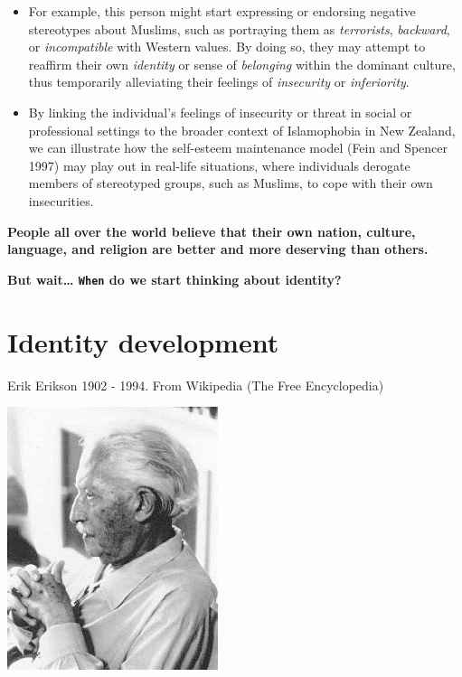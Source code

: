 \documentclass[
  ignorenonframetext,
  aspectratio=169,
]{beamer}
\providecommand{\tightlist}{%
  \setlength{\itemsep}{0pt}\setlength{\parskip}{0pt}}\usepackage{longtable,booktabs,array}
\begin{document}
\begin{frame}
\begin{itemize}[<+->]
\tightlist
\item
  For example, this person might start expressing or endorsing negative
  stereotypes about Muslims, such as portraying them as
  \emph{terrorists}, \emph{backward}, or \emph{incompatible} with
  Western values. By doing so, they may attempt to reaffirm their own
  \emph{identity} or sense of \emph{belonging} within the dominant
  culture, thus temporarily alleviating their feelings of
  \emph{insecurity} or \emph{inferiority}.
\item
  By linking the individual's feelings of insecurity or threat in social
  or professional settings to the broader context of Islamophobia in New
  Zealand, we can illustrate how the self-esteem maintenance model (Fein
  and Spencer 1997) may play out in real-life situations, where
  individuals derogate members of stereotyped groups, such as Muslims,
  to cope with their own insecurities.
\end{itemize}
\end{frame}

\begin{frame}
\textbf{People all over the world believe that their own nation,
culture, language, and religion are better and more deserving than
others.}
\end{frame}

\begin{frame}[fragile]
\textbf{But wait\ldots{} \texttt{When} do we start thinking about
identity?}
\end{frame}

\section{Identity development}\label{identity-development}

\begin{frame}{Erik Erikson}
\label{erik-erikson}
1902 - 1994. From Wikipedia (The Free Encyclopedia)

\begin{center}
\includegraphics{figs/Erik_Erikson.jpg}
\end{center}
\end{frame}
\end{document}
